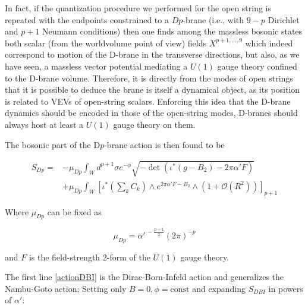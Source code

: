 In fact, if the quantization procedure we performed for the open string is repeated with the endpoints constrained to a $Dp$-brane (i.e., with $9-p$ Dirichlet and $p+1$ Neumann conditions) then one finds among the massless bosonic states both scalar (from the worldvolume point of view) fields $X^{p+1,\ldots,9}$ which indeed correspond to motion of the D-brane in the transverse directions, but also, as we have seen, a massless vector potential mediating a $U(1)$ gauge theory confined to the D-brane volume. Therefore, it is directly from the modes of open strings that it is possible to deduce the brane is itself a dynamical object, as its position is related to VEVs of open-string scalars. Enforcing this idea that the D-brane dynamics should be encoded in those of the open-string modes, D-branes should always host at least a $U(1)$ gauge theory on them.


The bosonic part of the D$p$-brane action is then found to be


\begin{align}
	S_{Dp} = & -\mu_{Dp} \int_W d^{p+1}\sigma e^{-\phi} \sqrt{ - \det \left( \iota^{*}(g - B_2) - 2\pi\alpha' F \right)} \label{actionDBI}\\
& + \mu_{Dp} \int_W \left[ \iota^{*}\left(\sum_k C_k \right) \wedge e^{2\pi\alpha'F-B_2} \wedge (1 + \mathcal{O}(R^2))
\right]_{p+1} 	\label{actionCS}
\end{align}

Where $\mu_{Dp}$ can be fixed as 

\begin{equation}
	\mu_{Dp} = \alpha'^{\,-\frac{p+1}2}(2\pi)^{-p}
	\label{}
\end{equation}

and $F$ is the field-strength 2-form of the $U(1)$ gauge theory.

The first line \eqref{actionDBI} is the Dirac-Born-Infeld action and generalizes the Nambu-Goto action; Setting only $B=0, \phi = \mathrm{const}$ and expanding $S_{DBI}$ in powers of $\alpha'$:

